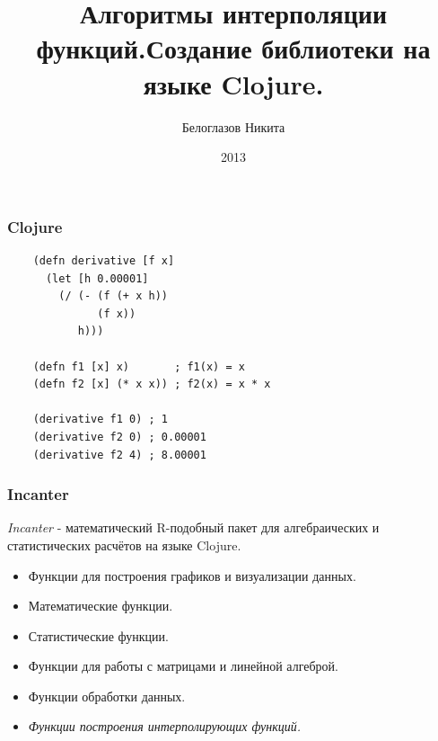 \documentclass[russian]{beamer}
\title[Интерполяция]{Алгоритмы интерполяции функций.\newline Создание библиотеки на языке Clojure.}
\author{Белоглазов Никита}
\date{2013}
\institute{Белорусский Государственный Университет}
\begin{document}
\maketitle
\begin{frame}[fragile]
  \frametitle{Clojure}
  \begin{verbatim}
    (defn derivative [f x]
      (let [h 0.00001]
        (/ (- (f (+ x h))
              (f x))
           h)))

    (defn f1 [x] x)       ; f1(x) = x
    (defn f2 [x] (* x x)) ; f2(x) = x * x

    (derivative f1 0) ; 1
    (derivative f2 0) ; 0.00001
    (derivative f2 4) ; 8.00001
  \end{verbatim}
\end{frame}

\begin{frame}
  \frametitle{Incanter}

  \emph{Incanter} - математический R-подобный пакет для алгебраических и статистических расчётов на языке Clojure.

  \begin{itemize}

  \item Функции для построения графиков и визуализации данных.

  \item Математические функции.

  \item Статистические функции.

  \item Функции для работы с матрицами и линейной алгеброй.

  \item Функции обработки данных.

  \item \emph{Функции построения интерполирующих функций.}
  \end{itemize}
\end{frame}
\end{document}
